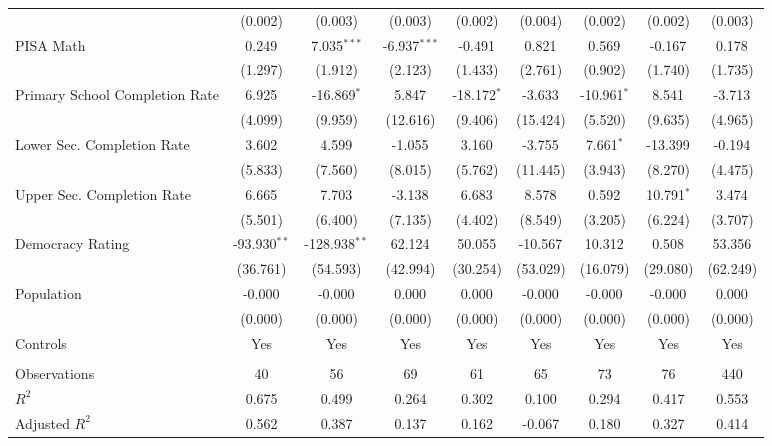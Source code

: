 \documentclass[11pt]{article}
\begin{document}
\begin{table}[H]
{\begin{tabular}{@{\extracolsep{1pt}}lcccccccc}
            & (0.002) & (0.003) & (0.003) & (0.002) & (0.004) & (0.002) & (0.002) & (0.003) \\
            PISA Math & 0.249$^{}$ & 7.035$^{***}$ & -6.937$^{***}$ & -0.491$^{}$ & 0.821$^{}$ & 0.569$^{}$ & -0.167$^{}$ & 0.178$^{}$ \\
            & (1.297) & (1.912) & (2.123) & (1.433) & (2.761) & (0.902) & (1.740) & (1.735) \\
            Primary School Completion Rate & 6.925$^{}$ & -16.869$^{*}$ & 5.847$^{}$ & -18.172$^{*}$ & -3.633$^{}$ & -10.961$^{*}$ & 8.541$^{}$ & -3.713$^{}$ \\
            & (4.099) & (9.959) & (12.616) & (9.406) & (15.424) & (5.520) & (9.635) & (4.965) \\
            Lower Sec. Completion Rate & 3.602$^{}$ & 4.599$^{}$ & -1.055$^{}$ & 3.160$^{}$ & -3.755$^{}$ & 7.661$^{*}$ & -13.399$^{}$ & -0.194$^{}$ \\
            & (5.833) & (7.560) & (8.015) & (5.762) & (11.445) & (3.943) & (8.270) & (4.475) \\
            Upper Sec. Completion Rate & 6.665$^{}$ & 7.703$^{}$ & -3.138$^{}$ & 6.683$^{}$ & 8.578$^{}$ & 0.592$^{}$ & 10.791$^{*}$ & 3.474$^{}$ \\
            & (5.501) & (6.400) & (7.135) & (4.402) & (8.549) & (3.205) & (6.224) & (3.707) \\
            Democracy Rating & -93.930$^{**}$ & -128.938$^{**}$ & 62.124$^{}$ & 50.055$^{}$ & -10.567$^{}$ & 10.312$^{}$ & 0.508$^{}$ & 53.356$^{}$ \\
            & (36.761) & (54.593) & (42.994) & (30.254) & (53.029) & (16.079) & (29.080) & (62.249) \\
            Population & -0.000$^{}$ & -0.000$^{}$ & 0.000$^{}$ & 0.000$^{}$ & -0.000$^{}$ & -0.000$^{}$ & -0.000$^{}$ & 0.000$^{}$ \\
            & (0.000) & (0.000) & (0.000) & (0.000) & (0.000) & (0.000) & (0.000) & (0.000) \\
            Controls & Yes & Yes & Yes & Yes & Yes & Yes & Yes & Yes \\
            \hline \\[-1.8ex]
            Observations & 40 & 56 & 69 & 61 & 65 & 73 & 76 & 440 \\
            $R^2$ & 0.675 & 0.499 & 0.264 & 0.302 & 0.100 & 0.294 & 0.417 & 0.553 \\
            Adjusted $R^2$ & 0.562 & 0.387 & 0.137 & 0.162 & -0.067 & 0.180 & 0.327 & 0.414 \\

\end{tabular}}
\end{table}
\end{document}
